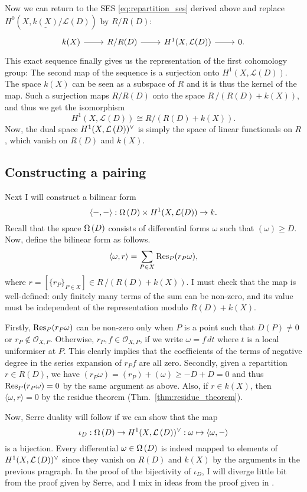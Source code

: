 Now we can return to the SES \eqref{eq:repartition_ses} derived above and
replace $H^{0}(X,\underline{k(X)}/\mathcal{L}(D))$ by $R/R(D)$:
\[
  \begin{tikzcd}
    k(X)\rar & R/R(D)\rar & H^{1}(X,\mathcal{L}(D))\rar & 0.
  \end{tikzcd}
\]
This exact sequence finally gives us the representation of the first
cohomology group: The second map of the sequence is a surjection
onto $H^{1}(X,\mathcal{L}(D))$. The space $k(X)$ can be seen as a subspace
of $R$ and it is thus the kernel of the map. Such a surjection maps $R/R(D)$
onto the space $R\,/\left(R(D)+k(X)\right)$, and thus we get the isomorphism
\[H^{1}(X,\mathcal{L}(D))\cong R/\left(R(D)+k(X)\right).\]
Now, the dual space $H^1(X,\mathcal{L}\left(D\right))^{\vee}$ is simply the space
of linear functionals on $R$, which vanish on $R(D)$ and $k(X)$.

\subsection{Constructing a pairing}
Next I will construct a bilinear form
\[
  \langle -,-\rangle:\Omega\left(D\right)\times H^{1}(X,\mathcal{L}(D))\to k.
\]
Recall that the space $\Omega\left(D\right)$ consists of differential forms $\omega$
such that $(\omega)\geq D$. Now, define the bilinear form as follows.
\[
  \langle\omega,r\rangle=\sum_{P\in X}\operatorname{Res}_{P}(r_{P}\omega),
\]
where $r=[\{r_{P}\}_{P\in X}]\in R\,/\left(R(D)+k(X)\right)$. I must check
that the map is well-defined: only finitely many terms of the sum can be
non-zero, and its value must be independent of the representation modulo
$R(D)+k(X)$.

Firstly, $\operatorname{Res}_{P}(r_{P}\omega)$ can be non-zero only when $P$ is a point
such that $D(P)\neq 0$ or $r_{P}\not\in\mathscr{O}_{X,P}$. Otherwise,
$r_{P},f\in\mathscr{O}_{X,P}$, if we write $\omega=f\,dt$ where $t$ is a
local uniformiser at $P$. This clearly implies that the coefficients of the
terms of negative degree in the series expansion of $r_{P}f$ are all zero.
Secondly, given a repartition $r\in R(D)$, we have $(r_{P}\omega)
=(r_{P})+(\omega) \geq -D+D=0$ and thus $\operatorname{Res}_{P}(r_{P}\omega)=0$ by the same
argument as above. Also, if $r\in k(X)$, then $\langle \omega,r\rangle=0$ by
the residue theorem (Thm.~\ref{thm:residue_theorem}).

Now, Serre duality will follow if we can show that the map
\[
  \iota_{D}:\Omega\left(D\right)\to H^1(X,\mathcal{L}\left(D\right))^{\vee}
  :\omega\mapsto\langle\omega,-\rangle
\]
is a bijection. Every differential $\omega\in\Omega\left(D\right)$ is indeed mapped
to elements of \linebreak $H^1(X,\mathcal{L}\left(D\right))^{\vee}$ since they vanish on $R(D)$ and $k(X)$
by the arguments in the previous pragraph. In the proof of the bijectivity of
$\iota_{D}$, I will diverge little bit from the proof given by Serre, and
I mix in ideas from the proof given in \cite{forster}.

